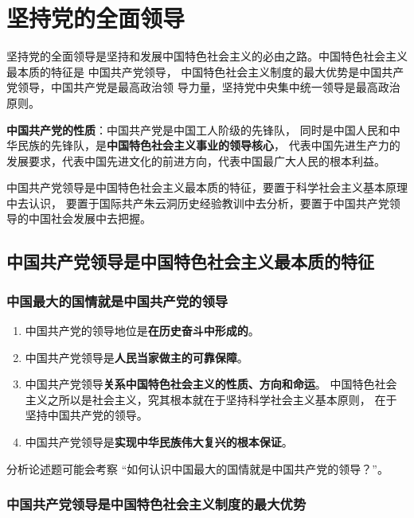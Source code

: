 \documentclass[UTF8,10pt]{ctexbook} %
\begin{document}
\chapter{坚持党的全面领导}

坚持党的全面领导是坚持和发展中国特色社会主义的必由之路。中国特色社会主义最本质的特征是
中国共产党领导， 中国特色社会主义制度的最大优势是中国共产党领导，中国共产党是最高政治领
导力量，坚持党中央集中统一领导是最高政治原则。
\begin{remark}
    \textbf{中国共产党的性质}：中国共产党是中国工人阶级的先锋队，
    同时是中国人民和中华民族的先锋队，是\textbf{中国特色社会主义事业的领导核心}，
    代表中国先进生产力的发展要求，代表中国先进文化的前进方向，代表中国最广大人民的根本利益。
\end{remark}
\begin{remark}
    中国共产党领导是中国特色社会主义最本质的特征，要置于科学社会主义基本原理中去认识，
    要置于国际共产朱云洞历史经验教训中去分析，要置于中国共产党领导的中国社会发展中去把握。
\end{remark}

\section{中国共产党领导是中国特色社会主义最本质的特征}

\subsection{中国最大的国情就是中国共产党的领导}

\begin{enumerate}[itemsep=0pt]
    \item 中国共产党的领导地位是\textbf{在历史奋斗中形成的}。
    \item 中国共产党领导是\textbf{人民当家做主的可靠保障}。
    \item 中国共产党领导\textbf{关系中国特色社会主义的性质、方向和命运}。
    中国特色社会主义之所以是社会主义，究其根本就在于坚持科学社会主义基本原则，
    在于坚持中国共产党的领导。
    \item 中国共产党领导是\textbf{实现中华民族伟大复兴的根本保证}。
\end{enumerate}
\begin{remark}
    分析论述题可能会考察 “如何认识中国最大的国情就是中国共产党的领导？”。
\end{remark}

\subsection{中国共产党领导是中国特色社会主义制度的最大优势}
\end{document}
